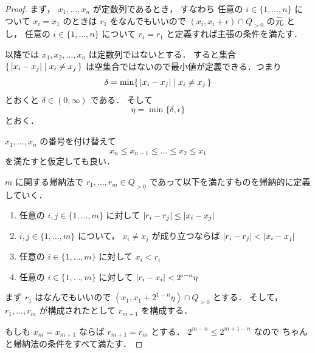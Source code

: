 \documentclass[leqno, 12pt]{jsarticle}
\DeclarePairedDelimiter{\abs}{\lvert}{\rvert}
\newcommand{\pospart}[1]{#1_{>0}}
\begin{document}
\begin{proof}


まず，
$x_{1}, \dots, x_{n}$
が定数列であるとき，
すなわち
任意の
$i\in \{1, \dots, n\}$
について
$x_{i}=x_{1}$
のときは
$r_{1}$
をなんでもいいので
$(x_{i}, x_{i}+\epsilon)\cap \pospart{Q}$
の元
とし，
任意の
$i\in \{1, \dots, n\}$
について%
$r_{i}=r_{1}$
と定義すれば主張の条件を満たす．

以降では
$x_{1}, x_{2}, \dots, x_{n}$%
は定数列ではないとする．
すると集合
$\{\, \abs{x_{i}-x_{j}} \mid x_{i}\neq x_{j}\, \}$
は空集合ではないので最小値が定義できる．つまり
\[
\delta=\min\{\, \abs{x_{i}-x_{j}} \mid x_{i}\neq x_{j}\, \}
\]
とおくと
$\delta\in (0, \infty)$
である．
そして
\[
\eta=\min\{\delta, \epsilon \}
\]
とおく．


$x_{1}, \dots, x_{n}$%
の番号を付け替えて
\[
x_{n}\le x_{n-1}\le \dots\le x_{2}\le x_{1}
\]
を満たすと仮定しても良い．

$m$%
に関する帰納法で
$r_{1}, \dots, r_{m}\in \pospart{Q}$%
であって以下を満たすものを帰納的に定義していく．
\begin{enumerate}[label=\textup{(\arabic*)}]
\item
任意の%
$i, j\in \{1, \dots, m\}$%
に対して
$\abs{r_{i}-r_{j}}\le \abs{x_{i}-x_{j}}$
\item
$i, j\in \{1, \dots, m\}$%
について，
$x_i\neq x_j$%
が成り立つならば
$\abs{r_{i}-r_{j}}<\abs{x_{i}-x_{j}}$
\item
任意の
$i\in \{1, \dots, m\}$
に対して
$  x_{i}<r_{i}$
\item
任意の
$i\in \{1, \dots, m\}$
に対して
$\abs{r_{i}-x_{i}}<2^{i-n}\eta$
\end{enumerate}


まず%
$r_{1}$
はなんでもいいので
$(x_{1}, x_{1}+2^{1-n}\eta)\cap \pospart{Q}$
とする．
そして，
$r_{1}, \dots, r_{m}$
が構成されたとして
$r_{m+1}$
を構成する．



もしも
$x_{m}=x_{m+1}$
ならば
$r_{m+1}=r_{m}$
とする．
$2^{m-n}\le 2^{m+1-n}$
なので
ちゃんと帰納法の条件をすべて満たす．


\end{proof}
\end{document}
